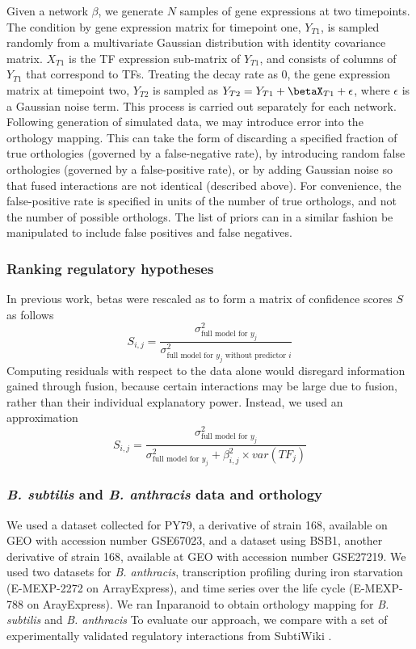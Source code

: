 \documentclass[11pt]{article}
\begin{document}
Given a network $\beta$, we generate $N$ samples of gene expressions at two timepoints. 
The condition by gene expression matrix for timepoint one, $Y_{T1}$, is sampled randomly from a multivariate Gaussian distribution with identity covariance matrix. $X_{T1}$ is the TF expression sub-matrix of $Y_{T1}$, and consists of columns of $Y_{T1}$ that correspond to TFs. 
Treating the decay rate as 0, the gene expression matrix at timepoint two, $Y_{T2}$ is sampled as $Y_{T2} = Y_{T1} + \betaX_{T1} + \epsilon$, where $\epsilon$ is a Gaussian noise term. 
This process is carried out separately for each network. 
Following generation of simulated data, we may introduce error into the orthology mapping. 
This can take the form of discarding a specified fraction of true orthologies (governed by a false-negative rate), by introducing random false orthologies (governed by a false-positive rate), or by adding Gaussian noise so that fused interactions are not identical (described above). 
For convenience, the false-positive rate is specified in units of the number of true orthologs, and not the number of possible orthologs. 
The list of priors can in a similar fashion be manipulated to include false positives and false negatives. 

\subsubsection{Ranking regulatory hypotheses}
In previous work, betas were rescaled as to form a matrix of confidence scores $S$ as follows
\begin{equation}
S_{i,j} = \frac{\sigma^2_{\text{full model for }y_j}}{\sigma^2_{\text{full model for }y_j \text{ without predictor }i}}
\end{equation}
Computing residuals with respect to the data alone would disregard information gained through fusion, because certain interactions may be large due to fusion, rather than their individual explanatory power. Instead, we used an approximation
\begin{equation}
S_{i,j} = \frac{\sigma^2_{\text{full model for }y_j}}{\sigma^2_{\text{full model for }y_j} + \beta_{i,j}^2 \times var(TF_j)}
\end{equation}

\subsubsection{\textit{B. subtilis} and \textit{B. anthracis} data and orthology}
We used a dataset collected for PY79, a derivative of strain 168, available on GEO with accession number GSE67023, and a dataset using BSB1, another derivative of strain 168, available at GEO with accession number GSE27219. 
We used two datasets for \textit{B. anthracis}, transcription profiling during iron starvation (E-MEXP-2272 on ArrayExpress), and time series over the life cycle (E-MEXP-788 on ArayExpress). We ran Inparanoid to obtain orthology mapping for \textit{B. subtilis} and \textit{B. anthracis} \cite{ostlund_inparanoid_2010} To evaluate our approach, we compare with a set of experimentally validated regulatory interactions from SubtiWiki \cite{michna_subtiwikidatabase_2014}. 
\end{document}
